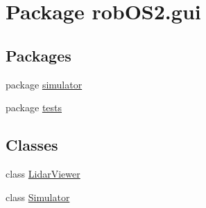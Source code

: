 \hypertarget{namespacerob_o_s2_1_1gui}{
\section{Package robOS2.gui}
\label{namespacerob_o_s2_1_1gui}
}
\subsection*{Packages}
\begin{DoxyCompactItemize}
\item 
package \hyperlink{namespacerob_o_s2_1_1gui_1_1simulator}{simulator}
\item 
package \hyperlink{namespacerob_o_s2_1_1gui_1_1tests}{tests}
\end{DoxyCompactItemize}
\subsection*{Classes}
\begin{DoxyCompactItemize}
\item 
class \hyperlink{classrob_o_s2_1_1gui_1_1_lidar_viewer}{LidarViewer}
\item 
class \hyperlink{classrob_o_s2_1_1gui_1_1_simulator}{Simulator}
\end{DoxyCompactItemize}
